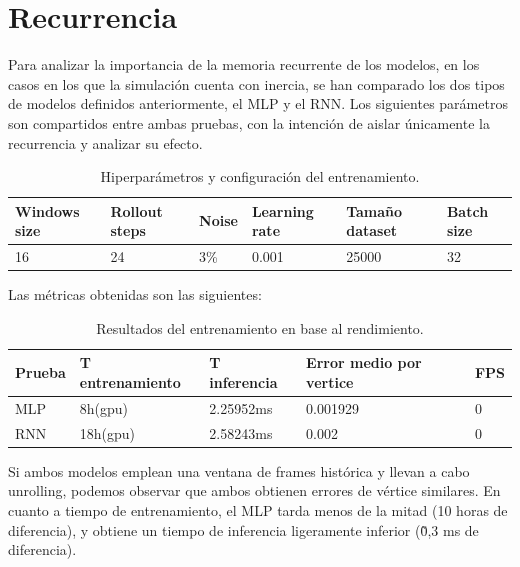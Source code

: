 \section{Recurrencia}
Para analizar la importancia de la memoria recurrente de los modelos, en los casos en los que la simulación cuenta con inercia, se han comparado los dos tipos de modelos definidos anteriormente, el MLP y el RNN. Los siguientes parámetros son compartidos entre ambas pruebas, con la intención de aislar únicamente la recurrencia y analizar su efecto.
\begin{table}[H]
    \begin{center}
        \begin{tabular}{ | m{2.2cm} | m{2cm} | m{1.2cm} | m{2.1cm} | m{2.4cm} | m{2.2cm} | }
        \hline \textbf{Windows size} & \textbf{Rollout steps} & \textbf{Noise} & \textbf{Learning rate} & \textbf{Tamaño dataset} & \textbf{Batch size} \\ \hline
            16 & 24 & 3\% & 0.001 & 25000 & 32 \\ \hline
        \end{tabular}
            \end{center}
    \caption{Hiperparámetros y configuración del entrenamiento.}
    \label{tab:randomTraining}
\end{table}
Las métricas obtenidas son las siguientes:

\begin{table}[H]
    \begin{center}
        \begin{tabular}{ | m{2.2cm} |  m{2.8cm} | m{2.8cm} | m{2.6cm} | m{1.2cm} |}
        \hline \textbf{Prueba} & \textbf{T entrenamiento} & \textbf{T inferencia} & \textbf{Error medio por vertice} & \textbf{FPS} \\ \hline
            MLP & 8h(gpu) & 2.25952ms & 0.001929 & 0 \\ \hline
            RNN & 18h(gpu) & 2.58243ms & 0.002 & 0 \\ \hline
        \end{tabular}
    \end{center}
    \caption{Resultados del entrenamiento en base al rendimiento.}
    \label{tab:rendResults}
\end{table}

Si ambos modelos emplean una ventana de frames histórica y llevan a cabo unrolling, podemos observar que ambos obtienen errores de vértice similares. En cuanto a tiempo de entrenamiento, el MLP tarda menos de la mitad (10 horas de diferencia), y obtiene un tiempo de inferencia ligeramente inferior (\~0,3 ms de diferencia). \newline

